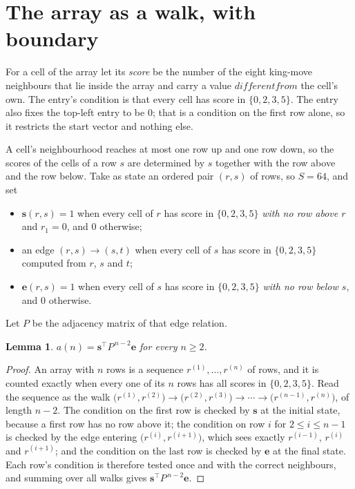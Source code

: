 \documentclass[11pt,a4paper]{article}
\theoremstyle{plain}
\newtheorem{lemma}[theorem]{Lemma}
\theoremstyle{definition}
\begin{document}
\section{The array as a walk, with boundary}

For a cell of the array let its \emph{score} be the number of the eight king-move neighbours that lie inside
the array and carry a value $different from$ the cell's own. The entry's condition is that every cell
has score in $\{0,2,3,5\}$. The entry also fixes the top-left entry to be $0$; that is a condition on the first row alone, so it restricts the start vector and nothing else.

A cell's neighbourhood reaches at most one row up and one row down, so the scores of the
cells of a row $s$ are determined by $s$ together with the row above and the row below.
Take as state an ordered pair $(r,s)$ of rows, so $S=64$, and set
\begin{itemize}
\item $\mathbf{s}(r,s)=1$ when every cell of $r$ has score in $\{0,2,3,5\}$ \emph{with no row
above $r$} and $r_1=0$, and $0$ otherwise;
\item an edge $(r,s)\to(s,t)$ when every cell of $s$ has score in $\{0,2,3,5\}$ computed from
$r$, $s$ and $t$;
\item $\mathbf{e}(r,s)=1$ when every cell of $s$ has score in $\{0,2,3,5\}$ \emph{with no row
below $s$}, and $0$ otherwise.
\end{itemize}
Let $P$ be the adjacency matrix of that edge relation.

\begin{lemma}\label{lem:walk}
$a(n)=\mathbf{s}^{\!\top}P^{\,n-2}\mathbf{e}$ for every $n\ge2$.
\end{lemma}

\begin{proof}
An array with $n$ rows is a sequence $r^{(1)},\dots,r^{(n)}$ of rows, and it is counted
exactly when every one of its $n$ rows has all scores in $\{0,2,3,5\}$. Read the sequence as the
walk $\bigl(r^{(1)},r^{(2)}\bigr)\to\bigl(r^{(2)},r^{(3)}\bigr)\to\cdots\to
\bigl(r^{(n-1)},r^{(n)}\bigr)$, of length $n-2$. The condition on the first row is
checked by $\mathbf{s}$ at the initial state, because a first row has no row above it; the
condition on row $i$ for $2\le i\le n-1$ is checked by the edge entering
$\bigl(r^{(i)},r^{(i+1)}\bigr)$, which sees exactly $r^{(i-1)}$, $r^{(i)}$ and
$r^{(i+1)}$; and the condition on the last row is checked by $\mathbf{e}$ at the final
state. Each row's condition is therefore tested once and with the correct neighbours, and
summing over all walks gives $\mathbf{s}^{\!\top}P^{\,n-2}\mathbf{e}$.
\end{proof}
\end{document}
